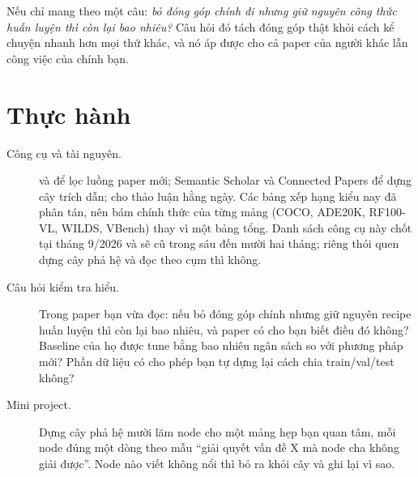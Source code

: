 \documentclass[../../deep_learning.tex]{subfiles}
\begin{document}
\begin{cannho}
Nếu chỉ mang theo một câu: \emph{bỏ đóng góp chính đi nhưng giữ nguyên công thức huấn luyện thì còn lại bao nhiêu?} Câu hỏi đó tách đóng góp thật khỏi cách kể chuyện nhanh hơn mọi thứ khác, và nó áp được cho cả paper của người khác lẫn công việc của chính bạn. 
\end{cannho}

\section{Thực hành}
\begin{description}
\item[Công cụ và tài nguyên.]  và  để lọc luồng paper mới; Semantic Scholar và Connected Papers để dựng cây trích dẫn;  cho thảo luận hằng ngày. Các bảng xếp hạng kiểu  nay đã phân tán, nên bám  chính thức của từng mảng (COCO, ADE20K, RF100-VL, WILDS, VBench) thay vì một bảng tổng. Danh sách công cụ này chốt tại tháng 9/2026 và sẽ cũ trong sáu đến mười hai tháng; riêng thói quen dựng cây phả hệ và đọc theo cụm thì không.
\item[Câu hỏi kiểm tra hiểu.] Trong paper bạn vừa đọc: nếu bỏ đóng góp chính nhưng giữ nguyên recipe huấn luyện thì còn lại bao nhiêu, và paper có cho bạn biết điều đó không? Baseline của họ được tune bằng bao nhiêu ngân sách so với phương pháp mới? Phần dữ liệu có cho phép bạn tự dựng lại cách chia train/val/test không?
\item[Mini project.] Dựng cây phả hệ mười lăm node cho một mảng hẹp bạn quan tâm, mỗi node đúng một dòng theo mẫu ``giải quyết vấn đề X mà node cha không giải được''. Node nào viết không nổi thì bỏ ra khỏi cây và ghi lại vì sao.
\end{description}
\end{document}

